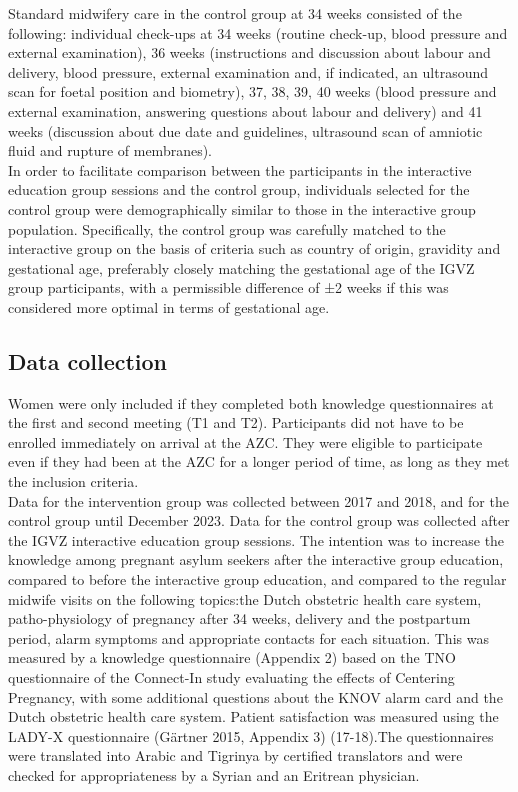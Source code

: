 \documentclass[12pt]{article}
\begin{document}
\noindent Standard midwifery care in the control group at 34 weeks consisted of the following: individual check-ups at 34 weeks (routine check-up, blood pressure and external examination), 36 weeks (instructions and discussion about labour and delivery, blood pressure, external examination and, if indicated, an ultrasound scan for foetal position and biometry), 37, 38, 39, 40 weeks (blood pressure and external examination, answering questions about labour and delivery) and 41 weeks (discussion about due date and guidelines, ultrasound scan of amniotic fluid and rupture of membranes). \\
\noindent In order to facilitate comparison between the participants in the interactive education group sessions and the control group, individuals selected for the control group were demographically similar to those in the interactive group population. Specifically, the control group was carefully matched to the interactive group on the basis of criteria such as country of origin, gravidity and gestational age, preferably closely matching the gestational age of the IGVZ group participants, with a permissible difference of ±2 weeks if this was considered more optimal in terms of gestational age.

\subsection{Data collection}

\noindent Women were only included if they completed both knowledge questionnaires at the first and second meeting (T1 and T2). Participants did not have to be enrolled immediately on arrival at the AZC. They were eligible to participate even if they had been at the AZC for a longer period of time, as long as they met the inclusion criteria. \\

\noindent Data for the intervention group was collected between 2017 and 2018, and for the control group until December 2023. Data for the control group was collected after the IGVZ interactive education group sessions. The intention was to increase the knowledge among pregnant asylum seekers after the interactive group education, compared to before the interactive group education, and compared to the regular midwife visits on the following topics:the Dutch obstetric health care system, patho-physiology of pregnancy after 34 weeks, delivery and the postpartum period, alarm symptoms and appropriate contacts for each situation. This was measured by a knowledge questionnaire (Appendix 2) based on the TNO questionnaire of the Connect-In study evaluating the effects of Centering Pregnancy, with some additional questions about the KNOV alarm card and the Dutch obstetric health care system. Patient satisfaction was measured using the LADY-X questionnaire (Gärtner 2015, Appendix 3) (17-18).The questionnaires were translated into Arabic and Tigrinya by certified translators and were checked for appropriateness by a Syrian and an Eritrean physician. \\
\end{document}
